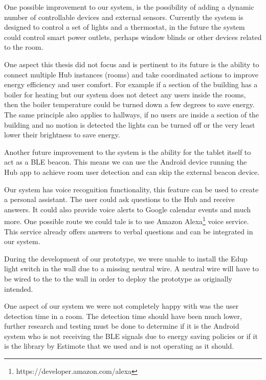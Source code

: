 One possible improvement to our system, is the possibility of adding a dynamic number of controllable devices and external sensors. Currently the system is designed to control a set of lights and a thermostat, in the future the system could control smart power outlets, perhaps window blinds or other devices related to the room.

One aspect this thesis did not focus and is pertinent to its future is the ability to connect multiple Hub instances (rooms) and take coordinated actions to improve energy efficiency and user comfort. For example if a section of the building has a boiler for heating but our system does not detect any users inside the rooms, then the boiler temperature could be turned down a few degrees to save energy. The same principle also applies to hallways, if no users are inside a section of the building and no motion is detected the lights can be turned off or the very least lower their brightness to save energy.

Another future improvement to the system is the ability for the tablet itself to act as a \ac{BLE} beacon. This means we can use the Android device running the Hub app to achieve room user detection and can skip the external beacon device.

Our system has voice recognition functionality, this feature can be used to create a personal assistant. The user could ask questions to the Hub and receive answers. It could also provide voice alerts to Google calendar events and much more. One possible route we could tale is to use Amazon Alexa\footnote{https://developer.amazon.com/alexa} voice service. This service already offers answers to verbal questions and can be integrated in our system.

During the development of our prototype, we were unable to install the Edup light switch in the wall due to a missing neutral wire. A neutral wire will have to be wired to the to the wall in order to deploy the prototype as originally intended. 

One aspect of our system we were not completely happy with was the user detection time in a room. The detection time should have been much lower, further research and testing must be done to determine if it is the Android system who is not receiving the BLE signals due to energy saving policies or if it is the library by Estimote that we used and is not operating as it should.


\cleardoublepage

